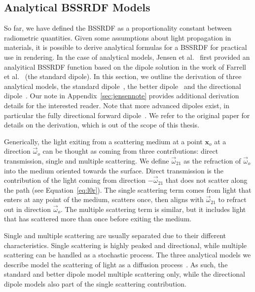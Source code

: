 \subsection{Analytical BSSRDF Models}
\label{sec:analyticalbssrdf}

So far, we have defined the BSSRDF as a proportionality constant between radiometric quantities. Given some assumptions about light propagation in materials, it is possible to derive analytical formulas for a BSSRDF for practical use in rendering. In the case of analytical models, Jensen et al.~\cite{Jensen2001} first provided an analyitical BSSRDF function based on the dipole solution in the work of Farrell et al.~\cite{Farrell1992} (the standard dipole). In this section, we outline the derivation of three analytical models, the standard dipole~\cite{Jensen2001}, the better dipole~\cite{dEon2012} and the directional dipole~\cite{Frisvad2014}. Our note in Appendix~\ref{sec:jensennote} provides additional derivation details for the interested reader. Note that more advanced dipoles exist, in particular the fully directional forward dipole~\cite{Frederickx2017}. We refer to the original paper for details on the derivation, which is out of the scope of this thesis.

Generically, the light exiting from a scattering medium at a point $\mathbf{x}_o$ at a direction $\vec{\omega}_o$ can be thought as coming from three contributions: direct transmission, single and multiple scattering. We define $\vec{\omega}_{21}$ as the refraction of $\vec{\omega}_o$ into the medium oriented towards the surface. Direct transmission is the contribution of the light coming from direction $-\vec{\omega}_{21}$ that does not scatter along the path (see Equation~\ref{eq:l0r}). The single scattering term comes from light that enters at any point of the medium, scatters once, then aligns with $\vec{\omega}_{21}$ to refract out in direction $\vec{\omega}_o$. The multiple scattering term is similar, but it includes light that has scattered more than once before exiting the medium. 

Single and multiple scattering are usually separated due to their different characteristics. Single scattering is highly peaked and directional, while multiple scattering can be handled as a stochastic process. The three analytical models we describe model the scattering of light as a diffusion process~\cite{Stam1995}. As such, the standard and better dipole model multiple scattering only, while the directional dipole models also part of the single scattering contribution. 

